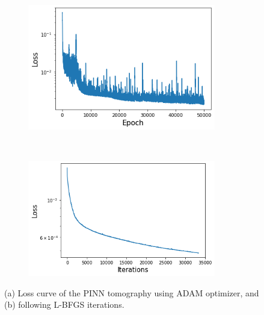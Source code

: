  \begin{figure}
       \centering
       \begin{subfigure}[b]{.45\textwidth}
               \centering
               \includegraphics[width=0.9\textwidth, height=0.7\textwidth]{figures/chap04_field_data/field_data_Adam.png} 
               \caption{}
               \label{fig:adam}
       \end{subfigure}%
       ~
       \begin{subfigure}[b]{.45\textwidth}
               \centering
               \includegraphics[width=0.9\textwidth,
               height=0.7\textwidth]{figures/chap04_field_data/field_data_LBFGS}
               \caption{}
               \label{fig:lbfgs}
       \end{subfigure}
       \caption{(a) Loss curve of the PINN tomography using ADAM optimizer, and (b) following L-BFGS iterations.}
       \label{fig:adam_LBFGS}
\end{figure}


